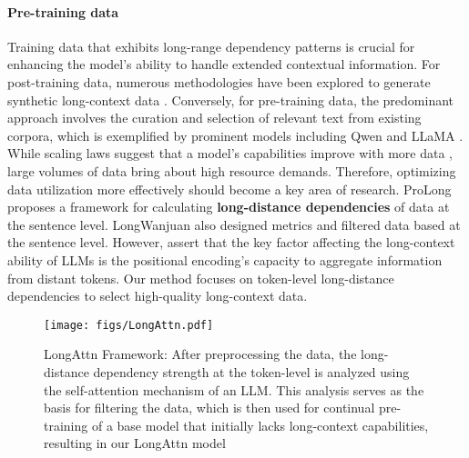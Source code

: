 \paragraph{Pre-training data} 
Training data that exhibits long-range dependency patterns is crucial for enhancing the model's ability to handle extended contextual information. For post-training data, numerous methodologies have been explored to generate synthetic long-context data \citep{wang2024bootstrap,Chen2024WhatAT,longalign,wu2024long}. Conversely, for pre-training data, the predominant approach involves the curation and selection of relevant text from existing corpora, which is exemplified by prominent models including Qwen \citep{bai2023qwen} and LLaMA \citep{touvron2023llama}. While scaling laws suggest that a model's capabilities improve with more data \citep{kaplan2020scaling}, large volumes of data bring about high resource demands. Therefore, optimizing data utilization more effectively should become a key area of research. ProLong \citep{chen2024long} proposes a framework for calculating \textbf{long-distance dependencies} of data at the sentence level. LongWanjuan \citep{lv2024longwanjuan} also designed metrics and filtered data based at the sentence level.
However, \citet{xiong-etal-2024-effective} assert that the key factor affecting the long-context ability of LLMs is the positional encoding's capacity to aggregate information from distant tokens. Our method focuses on token-level long-distance dependencies to select high-quality long-context data.
\begin{figure*}
  \texttt{[image: figs/LongAttn.pdf]}
  \caption{LongAttn Framework: After preprocessing the data, the long-distance dependency strength at the token-level is analyzed using the self-attention mechanism of an LLM. This analysis serves as the basis for filtering the data, which is then used for continual pre-training of a base model that initially lacks long-context capabilities, resulting in our LongAttn model}
  \label{fig:main}
\end{figure*}